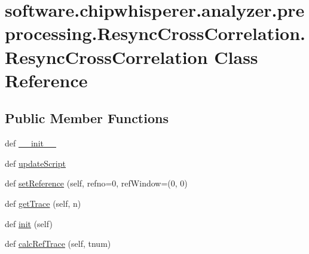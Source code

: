 \hypertarget{classsoftware_1_1chipwhisperer_1_1analyzer_1_1preprocessing_1_1ResyncCrossCorrelation_1_1ResyncCrossCorrelation}{}\section{software.\+chipwhisperer.\+analyzer.\+preprocessing.\+Resync\+Cross\+Correlation.\+Resync\+Cross\+Correlation Class Reference}
\label{classsoftware_1_1chipwhisperer_1_1analyzer_1_1preprocessing_1_1ResyncCrossCorrelation_1_1ResyncCrossCorrelation}
\subsection*{Public Member Functions}
\begin{DoxyCompactItemize}
\item 
def \hyperlink{classsoftware_1_1chipwhisperer_1_1analyzer_1_1preprocessing_1_1ResyncCrossCorrelation_1_1ResyncCrossCorrelation_aa3856e1135db1d031dec141cb524531c}{\+\_\+\+\_\+init\+\_\+\+\_\+}
\item 
def \hyperlink{classsoftware_1_1chipwhisperer_1_1analyzer_1_1preprocessing_1_1ResyncCrossCorrelation_1_1ResyncCrossCorrelation_adf032dee2f0fc596b961890b1d2e95b3}{update\+Script}
\item 
def \hyperlink{classsoftware_1_1chipwhisperer_1_1analyzer_1_1preprocessing_1_1ResyncCrossCorrelation_1_1ResyncCrossCorrelation_ac17171232b0e7a086a4e8423da6a20fb}{set\+Reference} (self, refno=0, ref\+Window=(0, 0)
\item 
def \hyperlink{classsoftware_1_1chipwhisperer_1_1analyzer_1_1preprocessing_1_1ResyncCrossCorrelation_1_1ResyncCrossCorrelation_a741abda1c6f690e0b061fb8a54fbb8c8}{get\+Trace} (self, n)
\item 
def \hyperlink{classsoftware_1_1chipwhisperer_1_1analyzer_1_1preprocessing_1_1ResyncCrossCorrelation_1_1ResyncCrossCorrelation_a0d7e8201fb99ac85f7412c52d564f612}{init} (self)
\item 
def \hyperlink{classsoftware_1_1chipwhisperer_1_1analyzer_1_1preprocessing_1_1ResyncCrossCorrelation_1_1ResyncCrossCorrelation_a5140de54a23ed83ee56ba5f4a0e3e60c}{calc\+Ref\+Trace} (self, tnum)
\end{DoxyCompactItemize}
